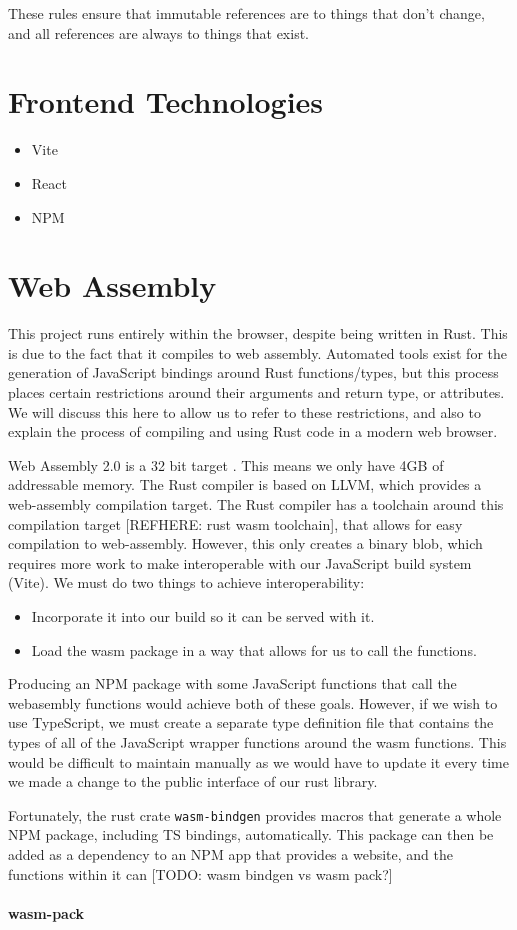 These rules ensure that immutable references are to things that don't change, and all references are always to things that exist.

\section{Frontend Technologies}
\label{bg:frontend}
\begin{itemize}
    \item Vite
    \item React
    \item NPM
\end{itemize}

\section{Web Assembly} \label{bg:wasm}
This project runs entirely within the browser, despite being written in Rust. This is due to the fact that it compiles to web assembly. Automated tools exist for the generation of JavaScript bindings around Rust functions/types, but this process places certain restrictions around their arguments and return type, or attributes. We will discuss this here to allow us to refer to these restrictions, and also to explain the process of compiling and using Rust code in a modern web browser. 

Web Assembly 2.0 is a 32 bit target \cite{WebAssemblyCoreSpecification2}. This means we only have 4GB of addressable memory. The Rust compiler is based on LLVM, which provides a web-assembly compilation target. The Rust compiler has a toolchain around this compilation target [REFHERE: rust wasm toolchain], that allows for easy compilation to web-assembly. However, this only creates a binary blob, which requires more work to make interoperable with our JavaScript build system (Vite). We must do two things to achieve interoperability:
\begin{itemize}
    \item Incorporate it into our build so it can be served with it.
    \item Load the wasm package in a way that allows for us to call the functions.
\end{itemize}
Producing an NPM package with some JavaScript functions that call the webasembly functions would achieve both of these goals. However, if we wish to use TypeScript, we must create a separate type definition file that contains the types of all of the JavaScript wrapper functions around the wasm functions. This would be difficult to maintain manually as we would have to update it every time we made a change to the public interface of our rust library. 

Fortunately, the rust crate \verb|wasm-bindgen| provides macros that generate a whole NPM package, including TS bindings, automatically. This package can then be added as a dependency to an NPM app that provides a website, and the functions within it can [TODO: wasm bindgen vs wasm pack?]

\paragraph{wasm-pack}
\label{bg:wasm-pack}
